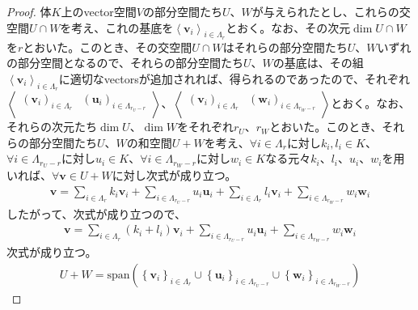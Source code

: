 \documentclass[dvipdfmx]{jsarticle}
\begin{document}
\begin{proof}
体$K$上のvector空間$V$の部分空間たち$U$、$W$が与えられたとし、これらの交空間$U \cap W$を考え、これの基底を$\left\langle \mathbf{v}_{i} \right\rangle_{i \in \varLambda_{r}}$とおく。なお、その次元$\dim{U \cap W}$を$r$とおいた。このとき、その交空間$U \cap W$はそれらの部分空間たち$U$、$W$いずれの部分空間となるので、それらの部分空間たち$U$、$W$の基底は、その組$\left\langle \mathbf{v}_{i} \right\rangle_{i \in \varLambda_{r}}$に適切なvectorsが追加されれば、得られるのであったので、それぞれ$\left\langle \begin{matrix}
\left( \mathbf{v}_{i} \right)_{i \in \varLambda_{r}} & \left( \mathbf{u}_{i} \right)_{i \in \varLambda_{r_{U} - r}} \\
\end{matrix} \right\rangle$、$\left\langle \begin{matrix}
\left( \mathbf{v}_{i} \right)_{i \in \varLambda_{r}} & \left( \mathbf{w}_{i} \right)_{i \in \varLambda_{r_{W} - r}} \\
\end{matrix} \right\rangle$とおく。なお、それらの次元たち$\dim U$、$\dim W$をそれぞれ$r_{U}$、$r_{W}$とおいた。このとき、それらの部分空間たち$U$、$W$の和空間$U + W$を考え、$\forall i \in \varLambda_{r}$に対し$k_{i},l_{i} \in K$、$\forall i \in \varLambda_{r_{U} - r}$に対し$u_{i} \in K$、$\forall i \in \varLambda_{r_{W} - r}$に対し$w_{i} \in K$なる元々$k_{i}$、$l_{i}$、$u_{i}$、$w_{i}$を用いれば、$\forall\mathbf{v} \in U + W$に対し次式が成り立つ。
\begin{align*}
\mathbf{v} = \sum_{i \in \varLambda_{r}} {k_{i}\mathbf{v}_{i}} + \sum_{i \in \varLambda_{r_{U} - r}} {u_{i}\mathbf{u}_{i}} + \sum_{i \in \varLambda_{r}} {l_{i}\mathbf{v}_{i}} + \sum_{i \in \varLambda_{r_{W} - r}} {w_{i}\mathbf{w}_{i}}
\end{align*}
したがって、次式が成り立つので、
\begin{align*}
\mathbf{v} = \sum_{i \in \varLambda_{r}} {\left( k_{i} + l_{i} \right)\mathbf{v}_{i}} + \sum_{i \in \varLambda_{r_{U} - r}} {u_{i}\mathbf{u}_{i}} + \sum_{i \in \varLambda_{r_{W} - r}} {w_{i}\mathbf{w}_{i}}
\end{align*}
次式が成り立つ。
\begin{align*}
U + W = {\mathrm{span}}\left( \left\{ \mathbf{v}_{i} \right\}_{i \in \varLambda_{r}} \cup \left\{ \mathbf{u}_{i} \right\}_{i \in \varLambda_{r_{U} - r}} \cup \left\{ \mathbf{w}_{i} \right\}_{i \in \varLambda_{r_{W} - r}} \right)
\end{align*}

\end{proof}
\end{document}
